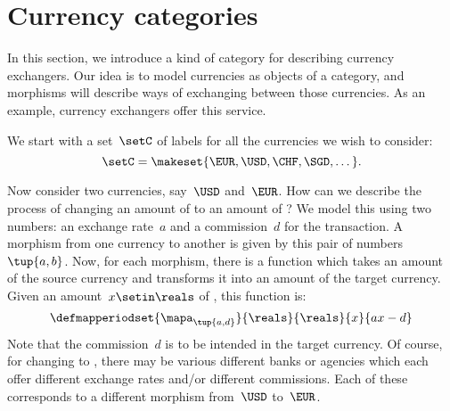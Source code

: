 
\section{Currency categories}
\label{sec:currency_cat}
In this section, we introduce a kind of category for describing currency exchangers.
Our idea is to model currencies as objects of a category, and morphisms will describe ways of exchanging between those currencies.
As an example, currency exchangers offer this service.

We start with a set~$\setC$ of labels for all the currencies we wish to consider:
\begin{equation*}
    \setC = \makeset{ \EUR, \USD, \CHF, \SGD, \dots }.
\end{equation*}


Now consider two currencies, say~$\USD$ and~$\EUR$.
How can we describe the process of changing an amount of \USD to an amount of \EUR?
We model this using two numbers: an exchange rate~$a$ and a commission~$d$ for the transaction.
A morphism from one currency to another is given by this pair of numbers~$\tup{a,b}$.
Now, for each morphism, there is a function which takes an amount of the source currency and transforms it into an amount of the target currency.
Given an amount~$x \setin \reals$ of \USD, this function is:
\begin{equation*}
    \label{eq:def_curr_ex}
    \defmapperiodset{\mapa_{\tup{a,d}}}{\reals}{\reals}{x}{ax-d}
\end{equation*}
Note that the commission~$d$ is to be intended in the target currency.
Of course, for changing \USD to \EUR, there may be various different banks or agencies which each offer different exchange rates and/or different commissions.
Each of these corresponds to a different morphism from~$\USD$ to~$\EUR$.

